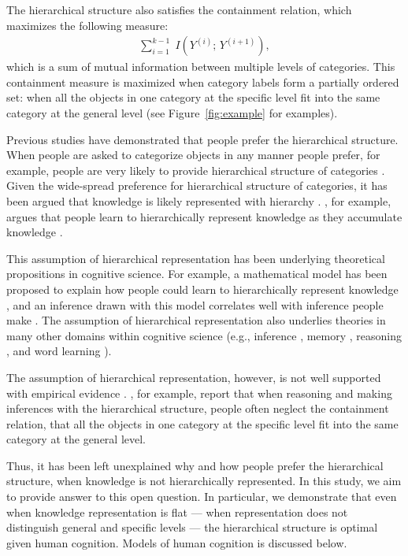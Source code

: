 \documentclass[doc]{apa6}
\begin{document}
The hierarchical structure also satisfies the containment relation, which maximizes the following
measure:
\begin{align}
    \sum_{i=1}^{k-1} \; I \left( Y^{(i)};\, Y^{(i + 1)} \right),
\label{eqn:containment}
\end{align}
which is a sum of mutual information between multiple levels of categories. This containment measure
is maximized when category labels form a partially ordered set: when all the objects in one category
at the specific level fit into the same category at the general level (see Figure~\ref{fig:example} for
examples).

Previous studies have demonstrated that people prefer the hierarchical structure.  When people are
asked to categorize objects in any manner people prefer, for example, people are very likely to
provide hierarchical structure of categories \parencite[e.g.,][]{Rosch1976a}.  Given the wide-spread
preference for hierarchical structure of categories, it has been argued that knowledge is likely
represented with hierarchy \parencite[e.g.,][]{Markman1984a, Markman1989a}.
\textcite{Markman1989a}, for example, argues that people learn to hierarchically represent knowledge
as they accumulate knowledge \parencite[see also][]{Vygotsky1962a, Inhelder1964a}.

This assumption of hierarchical representation has been underlying theoretical propositions in
cognitive science. For example, a mathematical model has been proposed to explain how people could
learn to hierarchically represent knowledge \parencite{Kemp2008a}, and an inference drawn with this
model correlates well with inference people make \parencite{Kemp2009a}.  The assumption of
hierarchical representation also underlies theories in many other domains within cognitive science
(e.g., inference \parencite{Osherson1990a}, memory \parencite{Bower1969a, Glass1975a}, reasoning
\parencite{Collins1989a, Shastri1993a}, and word learning \parencite{Xu2007a}).

The assumption of hierarchical representation, however, is not well supported with empirical
evidence \parencite[see][for review]{Murphy1997a}. \textcite{Sloman1998a}, for example, report that
when reasoning and making inferences with the hierarchical structure, people often neglect the
containment relation, that all the objects in one category at the specific level fit into the same
category at the general level.

Thus, it has been left unexplained why and how people prefer the hierarchical structure, when
knowledge is not hierarchically represented. In this study, we aim to provide answer to this open
question. In particular, we demonstrate that even when knowledge representation is flat --- when
representation does not distinguish general and specific levels --- the hierarchical structure is
optimal given human cognition. Models of human cognition is discussed below.
\end{document}
